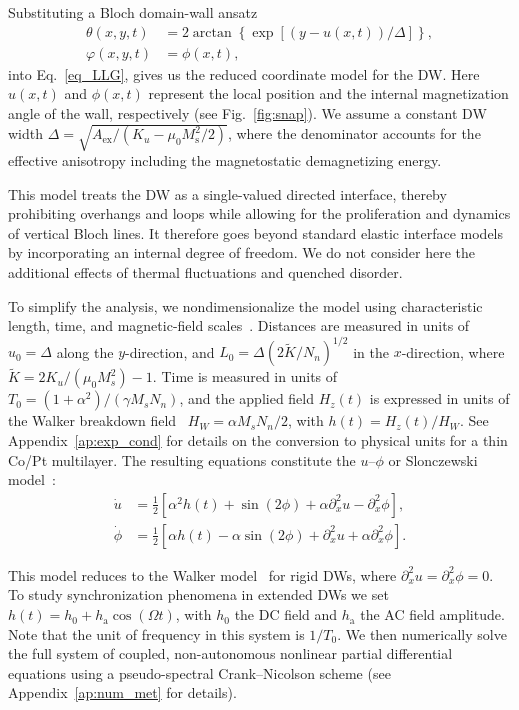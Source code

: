 \documentclass[prb,aps,twocolumn,superscriptaddress,floatfix]{revtex4-1}
\begin{document}
Substituting a Bloch domain-wall ansatz
%
\begin{align}
    \theta(x, y, t) &= 2 \arctan\left\{ \exp[{(y - u(x, t))}/{\Delta}] \right\},     \label{eq:Bloch1} \\
    \label{eq:Bloch2}
    \varphi(x, y, t) &= \phi(x, t), 
\end{align}
%
into Eq.~\eqref{eq_LLG}, gives us the reduced coordinate model for the DW. Here $u(x, t)$ and $\phi(x, t)$ represent the local position and the internal magnetization angle of the wall, respectively (see Fig.~\ref{fig:snap}). We assume a constant DW width $\Delta = \sqrt{A_\text{ex}/\left(K_u - \mu_0 M_\text{s}^2/2\right)}$, where the denominator accounts for the effective anisotropy including the magnetostatic demagnetizing energy. 

This model treats the DW as a single-valued directed interface, thereby prohibiting overhangs and loops while allowing for the proliferation and dynamics of vertical Bloch lines. It therefore goes beyond standard elastic interface models by incorporating an internal degree of freedom. We do not consider here the additional effects of thermal fluctuations and quenched disorder.

To simplify the analysis, we nondimensionalize the model using characteristic length, time, and magnetic-ﬁeld scales~\cite{pusiol2026deterministic}. Distances are measured in units of $u_0 = \Delta$ along the $y$-direction, and $L_0 = \Delta ({2\tilde{K}/N_n})^{1/2}$ in the $x$-direction, where $\tilde{K} = 2 K_u / (\mu_0 M_{s}^2) - 1$. Time is measured in units of $T_0 =(1+\alpha^{2})/(\gamma M_s N_n)$, and the applied field $H_{z}(t)$ is expressed in units of the Walker breakdown field~\cite{skaugen2019} $H_W = \alpha M_s N_n / 2$, with $h(t)=H_{z}(t)/H_{W}$. See Appendix~\ref{ap:exp_cond} for details on the conversion to physical units for a thin Co/Pt multilayer. The resulting equations constitute the $u$--$\phi$ or Slonczewski model~\cite{Slonczewski1972}:
%
\begin{align}
\dot{u} &= \frac{1}{2} \left[ \alpha^2 h(t) + \sin(2\phi) + \alpha \partial_x^2 u - \partial_x^2 \phi \right], \nonumber \\
\dot{\phi} &= \frac{1}{2} \left[ \alpha h(t) - \alpha \sin(2\phi) + \partial_x^2 u + \alpha \partial_x^2 \phi \right].
\label{eq:uphi}
\end{align}
%

This model reduces to the Walker model~\cite{Schryer1974} for rigid DWs, where $\partial ^2_xu=\partial^2_x\phi=0$. To study synchronization phenomena in extended DWs we set $h(t)=h_\text{0}+h_\text{a}\cos\left(\Omega t\right)$, with $h_{0}$ the DC field and $h_{\text{a}}$ the AC field amplitude. Note that the unit of frequency in this system is $1/T_0$. We then numerically solve the full system of coupled, non-autonomous nonlinear partial differential equations using a pseudo-spectral Crank--Nicolson scheme (see Appendix~\ref{ap:num_met} for details).
\end{document}
